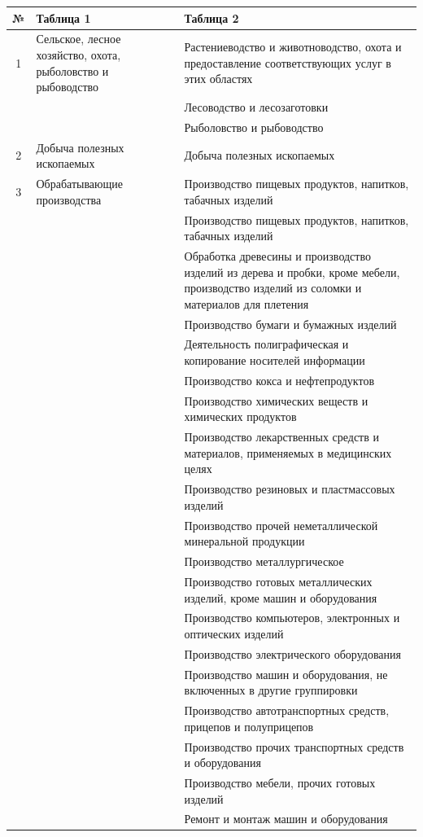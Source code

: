 \documentclass[12pt, a4paper]{article}
\begin{document}
\begin{tabular}[t]{|c|p{6cm}|p{9cm}|}
\hline
	№ & Таблица 1 & Таблица 2\\
\hline
1 & Сельское, лесное хозяйство, охота, рыболовство и рыбоводство &  
 Растениеводство и животноводство, охота и предоставление соответствующих услуг в этих областях\\\cline{3-3}
 && Лесоводство и лесозаготовки\\ \cline{3-3}
 && Рыболовство и рыбоводство\\\cline{1-3}
2 & Добыча полезных ископаемых & Добыча полезных ископаемых\\\cline{1-3}
3 & Обрабатывающие производства & Производство пищевых  продуктов,  напитков, табачных изделий \\\cline{3-3}
&&Производство пищевых  продуктов,  напитков, табачных изделий  \\ \cline{3-3}
&& Обработка древесины и производство изделий из дерева и пробки, кроме мебели, производство изделий из соломки и материалов для плетения  \\ \cline{3-3}
&& Производство бумаги и бумажных изделий \\ \cline{3-3}
&& Деятельность полиграфическая и копирование носителей информации \\ \cline{3-3}
&& Производство кокса и нефтепродуктов \\ \cline{3-3}
&& Производство химических веществ и химических продуктов \\ \cline{3-3}
&& Производство лекарственных средств и материалов, применяемых в медицинских целях \\ \cline{3-3}
&& Производство резиновых и пластмассовых изделий \\ \cline{3-3}
&& Производство прочей неметаллической минеральной продукции \\ \cline{3-3}
&& Производство металлургическое \\ \cline{3-3}
&& Производство готовых металлических изделий, кроме машин и оборудования \\ \cline{3-3}
&& Производство компьютеров, электронных и оптических изделий \\ \cline{3-3}
&& Производство электрического оборудования \\ \cline{3-3}
&& Производство машин и оборудования, не включенных в другие группировки \\ \cline{3-3}
&& Производство автотранспортных средств, прицепов и полуприцепов \\ \cline{3-3}
&& Производство прочих транспортных средств и оборудования \\ \cline{3-3}
&& Производство мебели, прочих готовых изделий \\ \cline{3-3}
&& Ремонт и монтаж машин и оборудования \\ \cline{1-3}

\end{tabular}
\end{document}
